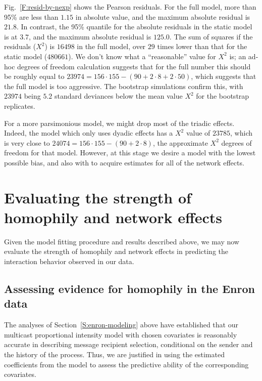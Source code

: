 \documentclass[final]{statsoc}
\begin{document}
Fig.~\ref{F:resid-by-nexp} shows the Pearson residuals.  For the full model,
more than 95\% are less than $1.15$ in absolute value, and the maximum
absolute residual is $21.8$.  In contrast, the 95\% quantile for the absolute
residuals in the static model is at $3.7$, and the maximum absolute residual
is $125.0$.  The sum of squares if the residuals ($X^2$) is $16498$ in the
full model, over $29$ times lower than that for the static model ($480661$).
We don't know what a ``reasonable'' value for $X^2$ is; an ad-hoc degrees of
freedom calculation suggests that for the full number this should be roughly
equal to $23974 = 156 \cdot 155 - (90 + 2 \cdot 8 + 2 \cdot 50)$, which
suggests that the full model is too aggressive.  The bootstrap simulations
confirm this, with $23974$ being $5.2$ standard deviances below the mean
value $X^2$ for the bootstrap replicates.

For a more parsimonious model, we might drop most of the triadic effects.
Indeed, the model which only uses dyadic effects has a $X^2$ value of $23785$,
which is very close to $24074 = 156 \cdot 155 - (90 + 2 \cdot 8)$, the
approximate $X^2$ degrees of freedom for that model.  However, at this stage
we desire a model with the lowest possible bias, and also with to acquire estimates for all
of the network effects.

\section{Evaluating the strength of homophily and network effects}\label{S:strength-of-effects}

Given the model fitting procedure and results described above, we may now evaluate the strength of homophily and network effects in predicting the interaction behavior observed in our data.

\subsection{Assessing evidence for homophily in the Enron data}\label{S:enron-homophily}

The analyses of Section~\ref{S:enron-modeling} above have established that our multicast proportional intensity model with chosen covariates is reasonably accurate in describing
message recipient selection, conditional on the sender and the history of the
process.  Thus, we are justified in using the estimated coefficients from the
model to assess the predictive ability of the corresponding covariates.  
\end{document}
